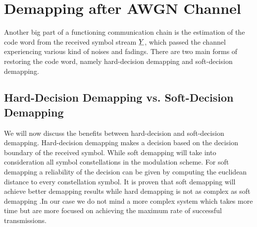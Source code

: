 \section{Demapping after AWGN Channel}
Another big part of a functioning communication chain is the estimation of the code word from the received symbol stream $\boldmath\underline{Y}$, which passed the channel experiencing various kind of noises and fadings. There are two main forms of restoring the code word, namely hard-decision demapping and soft-decision demapping.
\subsection{Hard-Decision Demapping vs. Soft-Decision Demapping}
We will now discuss the benefits between hard-decision and soft-decision demapping. Hard-decision demapping makes a decision based on the decision boundary of the received symbol. While soft demapping will take into consideration all symbol constellations in the modulation scheme. For soft demapping a reliability of the decision can be given by computing the euclidean distance to every constellation symbol.
It is proven that soft demapping will achieve better demapping results while hard demapping is not as complex as soft demapping \cite{GaussianWaves}.In our case we do not mind a more complex system which takes more time but are more focused on achieving the maximum rate of successful transmissions.
\newpage

